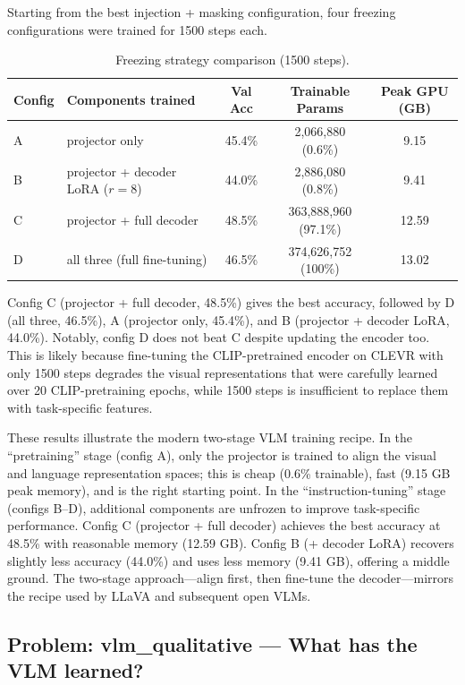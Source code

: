 \documentclass[11pt]{article}
\begin{document}
Starting from the best injection + masking configuration, four freezing
configurations were trained for 1500 steps each.

\begin{table}[H]
\centering
\caption{Freezing strategy comparison (1500 steps).}
\begin{tabular}{llccc}
\toprule
Config & Components trained & Val Acc & Trainable Params & Peak GPU (GB) \\
\midrule
A & projector only                    & 45.4\% & 2{,}066{,}880 (0.6\%)    & 9.15  \\
B & projector + decoder LoRA ($r=8$)  & 44.0\% & 2{,}886{,}080 (0.8\%)    & 9.41  \\
C & projector + full decoder          & 48.5\% & 363{,}888{,}960 (97.1\%) & 12.59 \\
D & all three (full fine-tuning)      & 46.5\% & 374{,}626{,}752 (100\%)  & 13.02 \\
\bottomrule
\end{tabular}
\end{table}

Config C (projector + full decoder, 48.5\%) gives the best accuracy, followed
by D (all three, 46.5\%), A (projector only, 45.4\%), and B (projector +
decoder LoRA, 44.0\%). Notably, config D does not beat C despite updating
the encoder too. This is likely because fine-tuning the CLIP-pretrained
encoder on CLEVR with only 1500 steps degrades the visual representations
that were carefully learned over 20 CLIP-pretraining epochs, while 1500 steps
is insufficient to replace them with task-specific features.

These results illustrate the modern two-stage VLM training recipe. In the
``pretraining'' stage (config A), only the projector is trained to align the
visual and language representation spaces; this is cheap (0.6\% trainable),
fast (9.15 GB peak memory), and is the right starting point. In the
``instruction-tuning'' stage (configs B--D), additional components are
unfrozen to improve task-specific performance. Config C (projector + full
decoder) achieves the best accuracy at 48.5\% with reasonable memory (12.59 GB).
Config B (+ decoder LoRA) recovers slightly less accuracy (44.0\%) and uses
less memory (9.41 GB), offering a middle ground. The two-stage approach---align
first, then fine-tune the decoder---mirrors the recipe used by LLaVA and
subsequent open VLMs.

\subsection*{Problem: vlm\_qualitative --- What has the VLM learned?}
\end{document}
